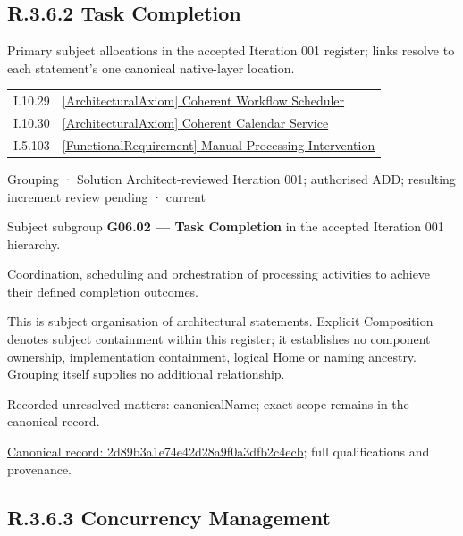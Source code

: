 \subsection*{R.3.6.2 Task Completion}
\label{navigation:R.3.6.2}

Primary subject allocations in the accepted Iteration 001 register; links resolve to each statement’s one canonical native-layer location.\par
\begin{longtable}{p{.22\linewidth}p{.73\linewidth}}
I.10.29 & \hyperref[element:99adfc9b5af049748df91755d395c247]{[ArchitecturalAxiom] Coherent Workflow Scheduler} \\
I.10.30 & \hyperref[element:a9b1d031fa844057aa030f09e4fa6b01]{[ArchitecturalAxiom] Coherent Calendar Service} \\
I.5.103 & \hyperref[element:911511665a8a4135b7f2a37f5f79ad36]{[FunctionalRequirement] Manual Processing Intervention} \\
\end{longtable}
\label{element:2d89b3a1e74e42d28a9f0a3dfb2c4ecb}
{\small Grouping · Solution Architect-reviewed Iteration 001; authorised ADD; resulting increment review pending · current}\par

Subject subgroup \textbf{G06.02 — Task Completion} in the accepted Iteration 001 hierarchy.



Coordination, scheduling and orchestration of processing activities to achieve their defined completion outcomes.



This is subject organisation of architectural statements. Explicit Composition denotes subject containment within this register; it establishes no component ownership, implementation containment, logical Home or naming ancestry. Grouping itself supplies no additional relationship.


{\small Recorded unresolved matters: canonicalName; exact scope remains in the canonical record.}\par
{\footnotesize \href{../../../../continuum/grouping/2d89b3a1e74e42d28a9f0a3dfb2c4ecb.md}{Canonical record: 2d89b3a1e74e42d28a9f0a3dfb2c4ecb}; full qualifications and provenance.}\par
\subsection*{R.3.6.3 Concurrency Management}
\label{navigation:R.3.6.3}

